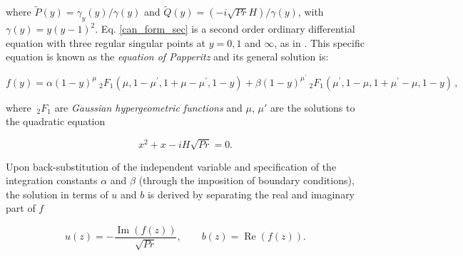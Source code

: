 %
where $\widetilde{P}(y)=\gamma_y(y)/\gamma(y)$ and $\widetilde{Q}(y) = (-i \sqrt{Pr} H)/\gamma(y)$, with $\gamma(y)=y(y-1)^2$.
Eq. \ref{can_form_sec} is a second order ordinary differential equation with three regular singular points at $y = 0,1$ and $\infty$, as in \citet{Morse1954a}. 
This specific equation is known as the \emph{equation of Papperitz} and its general solution is:
%
\begin{linenomath*}
\begin{equation}
	f(y) = \alpha (1-y)^\mu \ _2F_1 (\mu, 1- \mu^{\prime}, 1+\mu-\mu^{\prime}, 1-y)
	+\beta (1-y)^{\mu^{\prime}} \ _2F_1 (\mu^{\prime}, 1- \mu, 1+\mu^{\prime}-\mu, 1-y) \, ,
	\label{gen_sol_g}
\end{equation}
\end{linenomath*}
%
where $\ _2F_1$ are \emph{Gaussian hypergeometric functions} 
%
and $\mu$, $\mu'$ are the solutions to the quadratic equation

\begin{linenomath*}
\begin{equation*}
	x^2+x- i H \sqrt{Pr}=0.
\end{equation*}
\end{linenomath*}

%
Upon back-substitution of the independent variable and specification of the integration constants $\alpha$ and $\beta$ (through the imposition of boundary conditions), the solution in terms of $u$ and $b$ is derived by separating the real and imaginary part of $f$
%
\begin{linenomath*}
\begin{equation}
	u(z) = -\frac{\operatorname{Im}(f(z))}{\sqrt{Pr}}, \qquad b(z) = \operatorname{Re}(f(z)).
	\label{u_b_solutions}
\end{equation}
\end{linenomath*}
%

